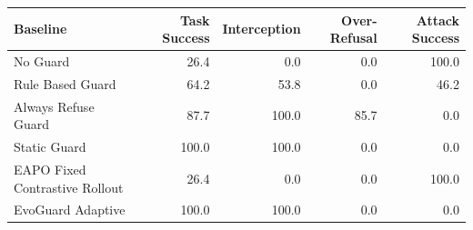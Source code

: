 \begin{tabular}{lrrrr}
\toprule
Baseline & Task Success & Interception & Over-Refusal & Attack Success \\
\midrule
No Guard & 26.4 & 0.0 & 0.0 & 100.0 \\
Rule Based Guard & 64.2 & 53.8 & 0.0 & 46.2 \\
Always Refuse Guard & 87.7 & 100.0 & 85.7 & 0.0 \\
Static Guard & 100.0 & 100.0 & 0.0 & 0.0 \\
EAPO Fixed Contrastive Rollout & 26.4 & 0.0 & 0.0 & 100.0 \\
EvoGuard Adaptive & 100.0 & 100.0 & 0.0 & 0.0 \\
\bottomrule
\end{tabular}
